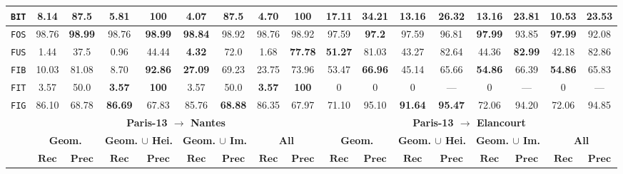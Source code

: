\begin{sidewaystable}
\begin{center}
\begin{tabular}{|c | c c | c c | c c | c c || c c | c c | c c | c c |}
                    \hline
                    \texttt{BIT} & \textbf{8.14} & 87.5 & 5.81 & \textbf{100} & 4.07 & 87.5 & 4.70 & \textbf{100} & \textbf{17.11} & \textbf{34.21} & 13.16 & 26.32 & 13.16 & 23.81 & 10.53 & 23.53 \\
                    \hline
                    \texttt{FOS} & 98.76 & \textbf{98.99} & 98.76 & \textbf{98.99} & \textbf{98.84} & 98.92 & 98.76 & 98.92 & 97.59 & \textbf{97.2} & 97.59 & 96.81 & \textbf{97.99} & 93.85 & \textbf{97.99} & 92.08 \\
                    \hline
                    \texttt{FUS} & 1.44 & 37.5 & 0.96 & 44.44 & \textbf{4.32} & 72.0 & 1.68 & \textbf{77.78} & \textbf{51.27} & 81.03 & 43.27 & 82.64 & 44.36 & \textbf{82.99} & 42.18 & 82.86 \\
                    \hline
                    \texttt{FIB} & 10.03 & 81.08 & 8.70 & \textbf{92.86} & \textbf{27.09} & 69.23 & 23.75 & 73.96 & 53.47 & \textbf{66.96} & 45.14 & 65.66 & \textbf{54.86} & 66.39 & \textbf{54.86} & 65.83 \\
                    \hline
                    \texttt{FIT} & 3.57 & 50.0 & \textbf{3.57} & \textbf{100} & 3.57 & 50.0 & \textbf{3.57} & \textbf{100} & 0 & 0 & 0 & --- & 0 & --- & 0 & --- \\
                    \hline
                    \texttt{FIG} & 86.10 & 68.78 & \textbf{86.69} & 67.83 & 85.76 & \textbf{68.88} & 86.35 & 67.97 & 71.10 & 95.10 & \textbf{91.64} & \textbf{95.47} & 72.06 & 94.20 & 72.06 & 94.85 \\
                    \hline
                    \hline
                    & \multicolumn{8}{c||}{\textbf{Paris-13 $\rightarrow$ Nantes}} & \multicolumn{8}{c|}{\textbf{Paris-13 $\rightarrow$ Elancourt}}\\
                    \hline
                    &\multicolumn{2}{c|}{\textbf{Geom.}} & \multicolumn{2}{c|}{\textbf{Geom. $\cup$ Hei.}} & \multicolumn{2}{c|}{\textbf{Geom. $\cup$ Im.}} & \multicolumn{2}{c||}{\textbf{All}} & \multicolumn{2}{c|}{\textbf{Geom.}} & \multicolumn{2}{c|}{\textbf{Geom. $\cup$ Hei.}} & \multicolumn{2}{c|}{\textbf{Geom. $\cup$ Im.}} & \multicolumn{2}{x{1.5cm}|}{\textbf{All}}\\
                    \cline{2-17}
                    & \(\bm{Rec}\) & \(\bm{Prec}\) &  \(\bm{Rec}\) & \(\bm{Prec}\) &  \(\bm{Rec}\) & \(\bm{Prec}\) &  \(\bm{Rec}\) & \(\bm{Prec}\) & \(\bm{Rec}\) & \(\bm{Prec}\) &  \(\bm{Rec}\) & \(\bm{Prec}\) &  \(\bm{Rec}\) & \(\bm{Prec}\) &  \(\bm{Rec}\) & \(\bm{Prec}\) \\

\end{tabular}
\end{center}
\end{sidewaystable}
